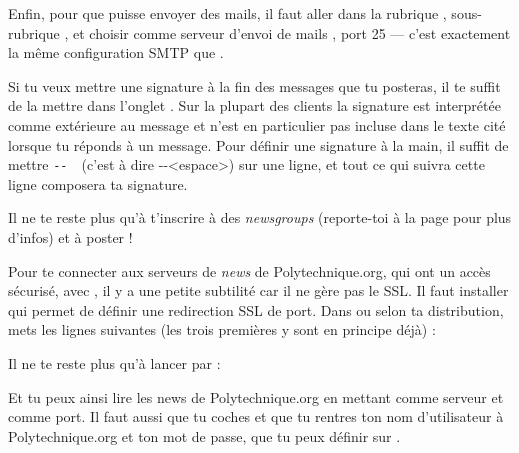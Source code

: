 Enfin, pour que  puisse envoyer des mails, il faut aller
dans la rubrique , sous-rubrique , et choisir comme serveur d'envoi de mails
, port 25 --- c'est exactement la m\^eme
configuration SMTP que .

Si tu veux mettre une signature à la fin des messages que tu
posteras, il te suffit de la mettre dans l'onglet .
Sur la plupart des clients la signature est interprétée comme
extérieure au message et n'est en particulier pas incluse dans le
texte cité lorsque tu réponds à un message. Pour définir une
signature à la main, il suffit de mettre \verb*+-- +\ (c'est à dire
-{}-<espace>) sur une ligne, et tout ce qui suivra cette ligne
composera ta signature.

Il ne te reste plus qu'à t'inscrire à des \emph{newsgroups} (reporte-toi à la page \pageref{newsgroups} pour plus d'infos) et à poster !

Pour te connecter aux serveurs de \emph{news} de Polytechnique.org, qui ont un accès sécurisé, avec , il y a une petite subtilité car il
ne gère pas le SSL. Il faut installer  qui permet de définir une redirection SSL de port. Dans  ou
 selon ta distribution, mets les lignes suivantes (les trois premières y sont en principe déjà) :


Il ne te reste plus qu'à lancer  par :


Et tu peux ainsi lire les news de Polytechnique.org en mettant  comme serveur et
 comme port. Il faut aussi que tu coches  et
que tu rentres ton nom d'utilisateur à Polytechnique.org et ton mot de passe, que tu peux définir
sur .
